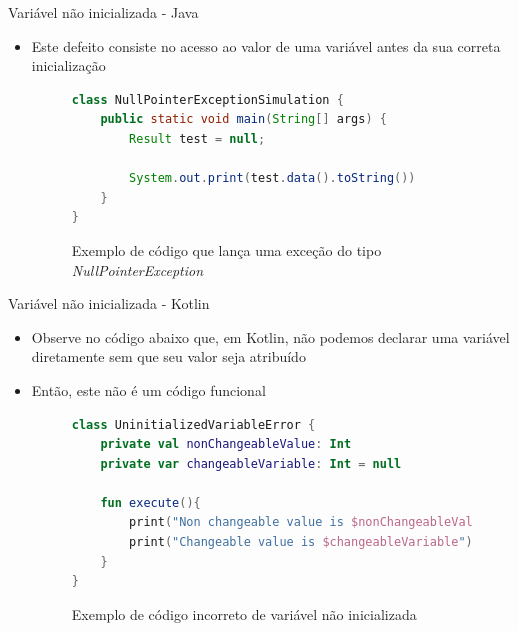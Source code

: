 \documentclass[brazilian]{beamer}
\begin{document}
\begin{frame}[fragile]{Variável não inicializada - Java}
    \begin{itemize}
        \item Este defeito consiste no acesso ao valor de uma variável antes da sua correta inicialização
        \begin{figure}[H]
            \centering
            \begin{lstlisting}[language=Java]
class NullPointerExceptionSimulation {
    public static void main(String[] args) {
        Result test = null;

        System.out.print(test.data().toString())
    }
}
            \end{lstlisting}
            \caption{Exemplo de código que lança uma exceção do tipo \textit{NullPointerException}}
            \label{fig:java_npe_code}
        \end{figure}
    \end{itemize}
\end{frame}

\begin{frame}[fragile]{Variável não inicializada - Kotlin}
    \begin{itemize}
        \item Observe no código abaixo que, em Kotlin, não podemos declarar uma variável diretamente sem que seu valor seja atribuído
        \item Então, este não é um código funcional
        \begin{figure}[H]
            \centering
            \begin{lstlisting}[language=kotlin]
class UninitializedVariableError {
    private val nonChangeableValue: Int
    private var changeableVariable: Int = null

    fun execute(){
        print("Non changeable value is $nonChangeableValue")
        print("Changeable value is $changeableVariable")
    }
}
            \end{lstlisting}
            \caption{Exemplo de código incorreto de variável não inicializada}
            \label{fig:kotlin_not_init_variable}
        \end{figure}
    \end{itemize}
\end{frame}
\end{document}
